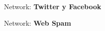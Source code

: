 \documentclass[12pt]{article}
\begin{document}
Network: \textbf{Twitter y Facebook} \cite{nr-aaai15}


Network: \textbf{Web Spam} \cite{graphrepository2013}



\end{document}
